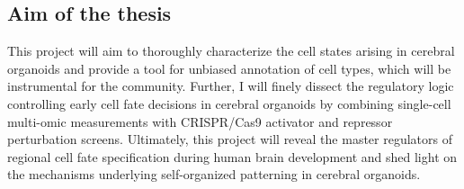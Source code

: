 \subsection{Aim of the thesis}
This project will aim to thoroughly characterize the cell states arising in cerebral organoids and provide a tool for unbiased annotation of cell types, which will be instrumental for the community. Further, I will finely dissect the regulatory logic controlling early cell fate decisions in cerebral organoids by combining single-cell multi-omic measurements with CRISPR/Cas9 activator and repressor perturbation screens. Ultimately, this project will reveal the master regulators of regional cell fate specification during human brain development and shed light on the mechanisms underlying self-organized patterning in cerebral organoids.


\beginbibliography
